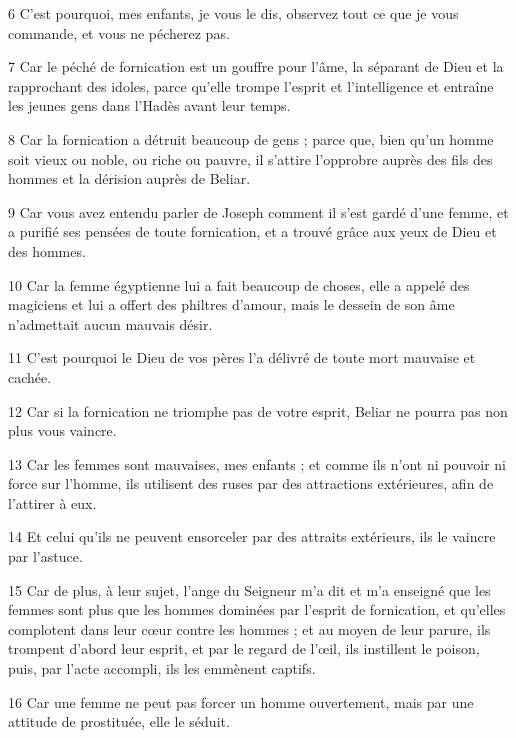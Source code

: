 \par 6 C'est pourquoi, mes enfants, je vous le dis, observez tout ce que je vous commande, et vous ne pécherez pas.

\par 7 Car le péché de fornication est un gouffre pour l'âme, la séparant de Dieu et la rapprochant des idoles, parce qu'elle trompe l'esprit et l'intelligence et entraîne les jeunes gens dans l'Hadès avant leur temps.

\par 8 Car la fornication a détruit beaucoup de gens ; parce que, bien qu'un homme soit vieux ou noble, ou riche ou pauvre, il s'attire l'opprobre auprès des fils des hommes et la dérision auprès de Beliar.

\par 9 Car vous avez entendu parler de Joseph comment il s'est gardé d'une femme, et a purifié ses pensées de toute fornication, et a trouvé grâce aux yeux de Dieu et des hommes.

\par 10 Car la femme égyptienne lui a fait beaucoup de choses, elle a appelé des magiciens et lui a offert des philtres d'amour, mais le dessein de son âme n'admettait aucun mauvais désir.

\par 11 C'est pourquoi le Dieu de vos pères l'a délivré de toute mort mauvaise et cachée.

\par 12 Car si la fornication ne triomphe pas de votre esprit, Beliar ne pourra pas non plus vous vaincre.

\par 13 Car les femmes sont mauvaises, mes enfants ; et comme ils n'ont ni pouvoir ni force sur l'homme, ils utilisent des ruses par des attractions extérieures, afin de l'attirer à eux.

\par 14 Et celui qu'ils ne peuvent ensorceler par des attraits extérieurs, ils le vaincre par l'astuce.

\par 15 Car de plus, à leur sujet, l'ange du Seigneur m'a dit et m'a enseigné que les femmes sont plus que les hommes dominées par l'esprit de fornication, et qu'elles complotent dans leur cœur contre les hommes ; et au moyen de leur parure, ils trompent d'abord leur esprit, et par le regard de l'œil, ils instillent le poison, puis, par l'acte accompli, ils les emmènent captifs.

\par 16 Car une femme ne peut pas forcer un homme ouvertement, mais par une attitude de prostituée, elle le séduit.

